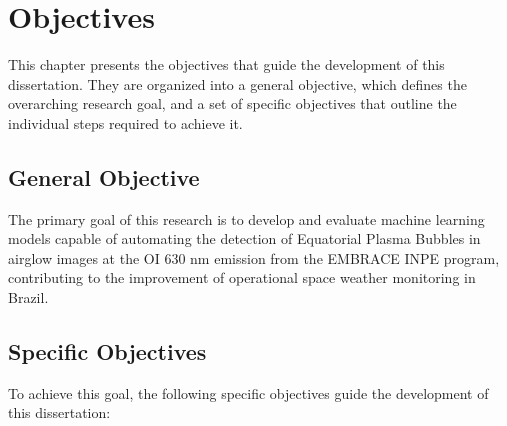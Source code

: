 \chapter{Objectives}\label{chap:objectives}

This chapter presents the objectives that guide the development of this dissertation. They are organized into a general objective, which defines the overarching research goal, and a set of specific objectives that outline the individual steps required to achieve it.

\section{General Objective}

The primary goal of this research is to develop and evaluate machine learning models capable of automating the detection of Equatorial Plasma Bubbles in airglow images at the OI 630 nm emission from the EMBRACE INPE program, contributing to the improvement of operational space weather monitoring in Brazil.

\section{Specific Objectives}

To achieve this goal, the following specific objectives guide the development of this dissertation:

